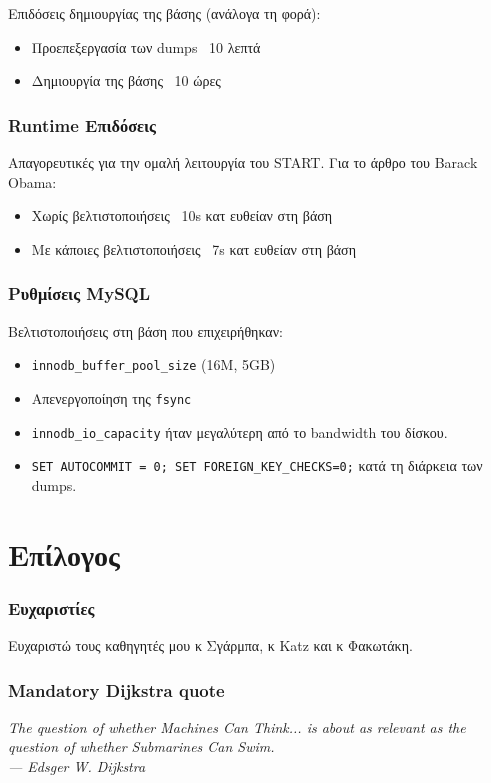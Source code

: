 \documentclass[bigger]{beamer}
\begin{document}
\begin{frame}
  Επιδόσεις δημιουργίας της βάσης (ανάλογα τη φορά):

  \begin{itemize}
  \item Προεπεξεργασία των dumps ~10 λεπτά
  \item Δημιουργία της βάσης ~10 ώρες
  \end{itemize}
\end{frame}

\begin{frame}
  \frametitle{Runtime Επιδόσεις}

  Απαγορευτικές για την ομαλή λειτουργία του START. Για το άρθρο του
  Barack Obama:
  \begin{itemize}
  \item Χωρίς βελτιστοποιήσεις ~10s κατ ευθείαν στη βάση
  \item Με κάποιες βελτιστοποιήσεις ~7s κατ ευθείαν στη βάση
  \end{itemize}
\end{frame}

\begin{frame}
  \frametitle{Ρυθμίσεις MySQL}

  Βελτιστοποιήσεις στη βάση που επιχειρήθηκαν:

  \begin{itemize}
  \item \texttt{innodb\_buffer\_pool\_size} \in (16Μ, 5GB)
  \item Απενεργοποίηση της \texttt{fsync}
  \item \texttt{innodb_io_capacity} ήταν μεγαλύτερη από το bandwidth
    του δίσκου.
  \item \texttt{SET AUTOCOMMIT = 0; SET FOREIGN_KEY_CHECKS=0;} κατά τη
    διάρκεια των dumps.
  \end{itemize}
\end{frame}

\section{Επίλογος}

\begin{frame}
  \frametitle{Ευχαριστίες}

  Ευχαριστώ τους καθηγητές μου κ Σγάρμπα, κ Katz και κ Φακωτάκη.

\end{frame}

\begin{frame}
  \frametitle{Mandatory Dijkstra quote}

  \vfill
  \textit{The question of whether Machines Can Think... is about as relevant as the question of whether Submarines Can Swim.\\
  \hfill --- Edsger W. Dijkstra}
  \vfill

\end{frame}
\end{document}
